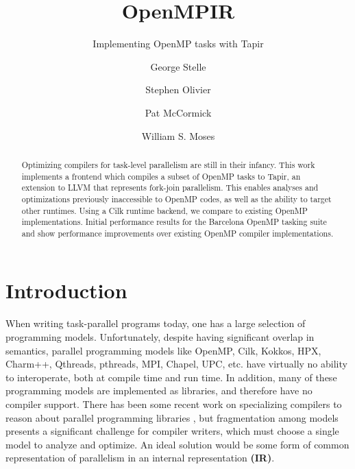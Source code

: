 \documentclass[sigconf]{acmart}
\begin{document}

\title{OpenMPIR}
\subtitle{Implementing OpenMP tasks with Tapir}
\author{George Stelle}

\author{Stephen Olivier}

\author{Pat McCormick}

\author{William S. Moses}

\begin{abstract}
Optimizing compilers for task-level parallelism are still in their infancy.
This work implements a frontend which compiles a subset of OpenMP tasks to
Tapir, an extension to LLVM that represents fork-join parallelism. This enables
analyses and optimizations previously inaccessible to OpenMP codes, as well as
the ability to target other runtimes. Using a Cilk runtime backend, we compare
to existing OpenMP implementations. Initial performance results for the
Barcelona OpenMP tasking suite and show performance improvements over existing
OpenMP compiler implementations. 
\end{abstract}

\maketitle

\section{Introduction}

When writing task-parallel programs today, one has a large selection of
programming models. Unfortunately, despite having significant overlap in
semantics, parallel programming models like OpenMP, Cilk, Kokkos, HPX, Charm++,
Qthreads, pthreads, MPI, Chapel, UPC, etc. have virtually no ability to
interoperate, both at compile time and run time. In addition, many of these
programming models are implemented as libraries, and therefore have no compiler
support. There has been some recent work on specializing compilers to reason
about parallel programming libraries \cite{Moss_2016}, but fragmentation among
models presents a significant challenge for compiler writers, which must choose
a single model to analyze and optimize. An ideal solution would be some form of
common representation of parallelism in an internal representation \textbf{(IR)}.
\end{document}
